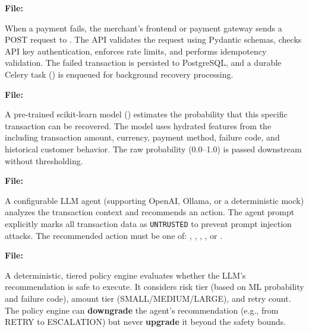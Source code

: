 \begin{tcolorbox}[featurebox={Step 1: Payment Ingestion}]
\textbf{File:} 

When a payment fails, the merchant's frontend or payment gateway sends a POST request to . The API validates the request using Pydantic schemas, checks API key authentication, enforces rate limits, and performs idempotency validation. The failed transaction is persisted to PostgreSQL, and a durable Celery task () is enqueued for background recovery processing.
\end{tcolorbox}

\begin{tcolorbox}[featurebox={Step 2: ML Probability Prediction}]
\textbf{File:} 

A pre-trained scikit-learn model () estimates the probability that this specific transaction can be recovered. The model uses hydrated features from the  including transaction amount, currency, payment method, failure code, and historical customer behavior. The raw probability (0.0--1.0) is passed downstream without thresholding.
\end{tcolorbox}

\begin{tcolorbox}[featurebox={Step 3: LLM Diagnosis}]
\textbf{File:} 

A configurable LLM agent (supporting OpenAI, Ollama, or a deterministic mock) analyzes the transaction context and recommends an action. The agent prompt explicitly marks all transaction data as \texttt{UNTRUSTED} to prevent prompt injection attacks. The recommended action must be one of: , , , , or .
\end{tcolorbox}

\begin{tcolorbox}[featurebox={Step 4: Policy Engine}]
\textbf{File:} 

A deterministic, tiered policy engine evaluates whether the LLM's recommendation is safe to execute. It considers risk tier (based on ML probability and failure code), amount tier (SMALL/MEDIUM/LARGE), and retry count. The policy engine can \textbf{downgrade} the agent's recommendation (e.g., from RETRY to ESCALATION) but never \textbf{upgrade} it beyond the safety bounds.
\end{tcolorbox}

